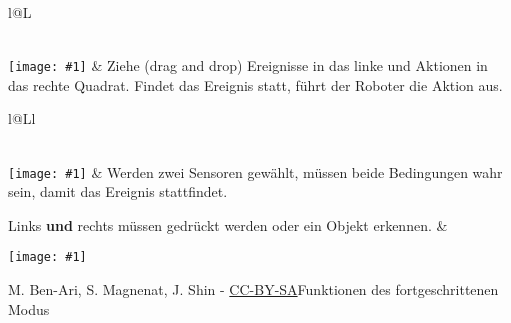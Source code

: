 \documentclass[a4paper]{article}
\newcommand*{\blk}[1]{\raisebox{-40pt}%
{\texttt{[image: \#1]}}}
\newcommand*{\blkbig}[1]{\raisebox{-50pt}%
{\texttt{[image: \#1]}}}
\begin{document}
\vfill

\begin{tabularx}{\textwidth}{l@{\hspace{.7cm}}L}

 \\[.4cm]


\blkbig{event-action-pair-empty} & Ziehe (drag and drop) Ereignisse in das linke und Aktionen in das rechte Quadrat. Findet das Ereignis statt, führt der Roboter die Aktion aus.
\\

\end{tabularx}

\vfill

\begin{tabularx}{\textwidth}{l@{\hspace{.7cm}}Ll}

 \\[.4cm]

\blk{sensor-and-button} & Werden zwei Sensoren gewählt, müssen beide Bedingungen wahr sein, damit das Ereignis stattfindet.

Links \textbf{und} rechts müssen gedrückt werden oder ein Objekt erkennen. &

\blk{sensor-and-prox}\\

\end{tabularx}

\vfill

{\normalsize M. Ben-Ari, S. Magnenat, J. Shin - \href{http://creativecommons.org/licenses/by-sa/3.0/}{CC-BY-SA}}\hfill\colorbox{advancedmode}{Funktionen des fortgeschrittenen Modus}
\end{document}
